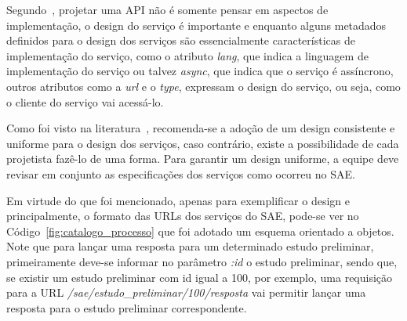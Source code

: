 Segundo~\cite{RestApiDesign:2011},
projetar uma \acrshort{API}
não é somente pensar em aspectos 
de implementação, 
o design do serviço
é importante e
enquanto alguns metadados 
definidos para o design dos 
serviços
são essencialmente características 
de implementação do serviço, 
como o atributo \textit{lang}, 
que indica a linguagem 
de implementação do serviço
ou talvez \textit{async}, que indica
que o serviço é assíncrono,
outros atributos
como a \textit{url} e o \textit{type}, 
expressam o design do serviço, 
ou seja, como o cliente do serviço vai acessá-lo.

Como foi visto na literatura~\cite{flanders2008restful},
recomenda-se a adoção
de um design consistente e uniforme 
para o design dos serviços, 
caso contrário,
existe a possibilidade de 
cada projetista fazê-lo de uma forma. 
Para garantir um design uniforme, a equipe
deve revisar em conjunto 
as especificações dos serviços
como ocorreu no \acrshort{SAE}.

Em virtude do que foi mencionado,
apenas para exemplificar o design e
principalmente, o formato 
das URLs dos serviços do \acrshort{SAE},
pode-se ver no
Código~\ref{fig:catalogo_processo} 
que foi adotado um esquema orientado a objetos.
Note que para lançar uma 
resposta para um determinado 
estudo preliminar, primeiramente 
deve-se informar no parâmetro \emph{:id} 
o estudo preliminar, 
sendo que, se existir um estudo preliminar
com id igual a 100, por exemplo,
uma requisição para a \acrshort{URL}
\emph{/sae/estudo\_preliminar/100/resposta} 
vai permitir lançar uma resposta para o estudo preliminar correspondente.



